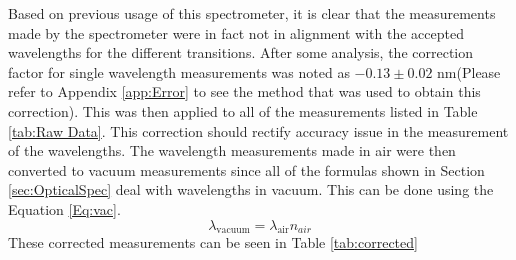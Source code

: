 \documentclass[%
 aps,%
 pra,%
 preprint, %
 amsmath, %
 amsfonts, %
 amssymb, %
]{revtex4-2}
\begin{document}
Based on previous usage of this spectrometer, it is clear that the measurements made by the spectrometer were in fact not in alignment with the accepted wavelengths for the different transitions. After some analysis, the correction factor for single wavelength measurements was noted as $-0.13\pm 0.02$ nm(Please refer to Appendix \ref{app:Error} to see the method that was used to obtain this correction). This was then applied to all of the measurements listed in Table \ref{tab:Raw Data}. This correction should rectify accuracy issue in the measurement of the wavelengths. The wavelength measurements made in air were then converted to vacuum measurements since all of the formulas shown in Section \ref{sec:OpticalSpec} deal with wavelengths in vacuum. This can be done using the Equation \ref{Eq:vac}.
\begin{equation}
    \label{Eq:vac}
    \lambda_{\text{vacuum}}=\lambda_{\text{air}}n_{air}
\end{equation}{}
These corrected measurements can be seen in Table \ref{tab:corrected}
\end{document}
